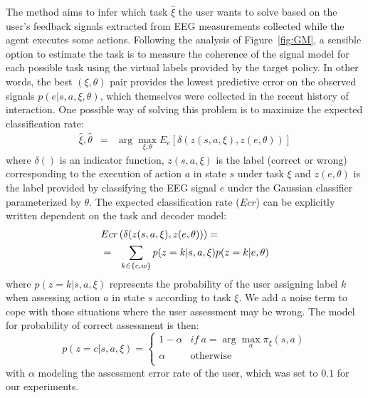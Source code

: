 \documentclass[letterpaper]{article}
\begin{document}
The method aims to infer which task $\hat{\xi}$ the user wants to solve based on the user's feedback signals extracted from EEG measurements collected while the agent executes some actions. Following the analysis of Figure~\ref{fig:GM}, a sensible option to estimate the task is to measure the coherence of the signal model for each possible task using the virtual labels provided by the target policy. In other words, the best $(\xi,\theta)$ pair provides the lowest predictive error on the observed signals $p(e|s,a,\xi,\theta)$, which themselves were collected in the recent history of interaction. One possible way of solving this problem is to maximize the expected classification rate:
%
\begin{eqnarray}
\hat{\xi},\hat{\theta}&=& \arg\max_{\xi,\theta} E_e\left[ \delta(z(s,a,\xi), z(e,\theta)) \right]
\end{eqnarray}
%
where $\delta()$ is an indicator function, $z(s,a,\xi)$ is the label (correct or wrong) corresponding to the execution of action $a$ in state $s$ under task $\xi$ and $z(e,\theta)$ is the label provided by classifying the EEG signal $e$ under the Gaussian classifier parameterized by $\theta$. The expected classification rate ($Ecr$) can be explicitly written dependent on the task and decoder model:
%
\begin{eqnarray}
\lefteqn{Ecr\left( \delta(z(s,a,\xi), z(e,\theta)) \right) =}\nonumber\\
 &=& \sum_{k \in \{c,w\}} p(z=k|s,a,\xi) p(z=k|e,\theta)
\label{eq:ecr} 
\end{eqnarray}
%
where $p(z=k|s,a,\xi)$ represents the probability of the user assigning label $k$ when assessing action $a$ in state $s$ according to task $\xi$. We add a noise term to cope with those situations where the user assessment may be wrong. The model for probability of correct assessment is then:
%
\begin{equation}
    p(z=c|s,a,\xi) = \begin{cases}
                           1-\alpha           & if~a = \arg\max_{a} \pi_{\xi}(s,a)\\
                           \alpha             & \text{otherwise}\\
                       \end{cases}
\end{equation}
%
with $\alpha$ modeling the assessment error rate of the user, which was set to $0.1$ for our experiments.
\end{document}
